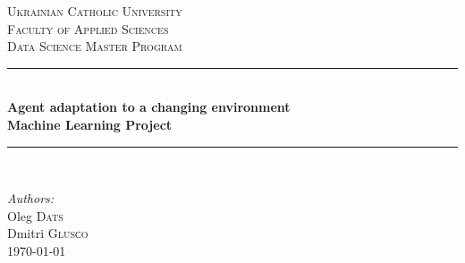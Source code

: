 \begin{titlepage}

\newcommand{\HRule}{\rule{\linewidth}{0.5mm}} %

\center %
 
\vspace*{0.5cm}
\textsc{\LARGE Ukrainian Catholic University}\\[1cm] %
\textsc{\Large  Faculty of Applied Sciences}\\[0.5cm] %
\textsc{\large Data Science Master Program}\\[0.5cm] %

\vspace*{1.5cm}

\HRule \\[0.4cm]
{ \huge \bfseries Agent adaptation to a changing environment}\\[10pt]
{\Large \bfseries Machine Learning Project}\\[0.4cm] %
\HRule \\[1cm]
 
\vspace*{2.5cm}

\Large \emph{Authors:}\\
Oleg  \textsc{Dats}\\
Dmitri \textsc{Glusсo}\\ %

\vspace*{0.5cm}
{\large \today}\\[0.5cm] %


\end{titlepage}

